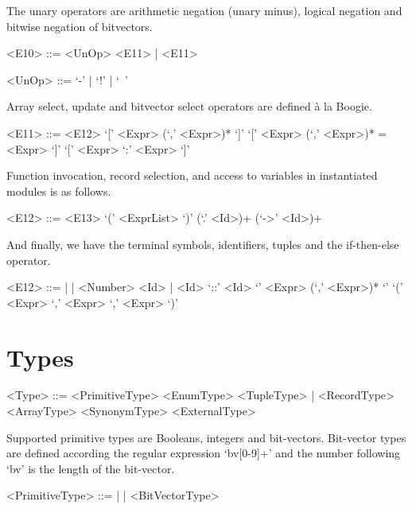 The unary operators are arithmetic negation (unary minus), logical negation and bitwise negation of bitvectors.
\begin{grammar}
    <E10> ::= <UnOp> <E11> | <E11>

    <UnOp> ::= `-' | `!' | `~'
\end{grammar}

Array select, update and bitvector select operators are defined \`a la Boogie.
\begin{grammar}
    <E11> ::= <E12> `[' <Expr> (`,' <Expr>)* `]'
           `[' <Expr> (`,' <Expr>)* = <Expr> `]'
           `[' <Expr> `:' <Expr> `]'
\end{grammar}

Function invocation, record selection, and access to variables in instantiated modules is as follows.
\begin{grammar}
    <E12> ::=  <E13> `(' <ExprList> `)'
           (`.' <Id>)+
           (`->' <Id>)+
\end{grammar}

And finally, we have the terminal symbols, identifiers, tuples and the if-then-else operator.
\begin{grammar}
    <E12> ::=  |  | <Number>
          \alt <Id> | <Id> `::' <Id>
          \alt `{' <Expr> (`,' <Expr>)* `}'
          \alt {} `(' <Expr> `,' <Expr> `,' <Expr> `)'
\end{grammar}

\section{Types}

\begin{grammar}
<Type> ::= <PrimitiveType> 
       \alt <EnumType> 
       \alt <TupleType> | <RecordType> 
       \alt <ArrayType> 
       \alt <SynonymType> 
       \alt <ExternalType> 
\end{grammar}

Supported primitive types are Booleans, integers and bit-vectors. Bit-vector types are defined according the regular expression `bv[0-9]+' and the number following `bv' is the length of the bit-vector.

\begin{grammar}
    <PrimitiveType> ::=  |  | <BitVectorType>
\end{grammar}

